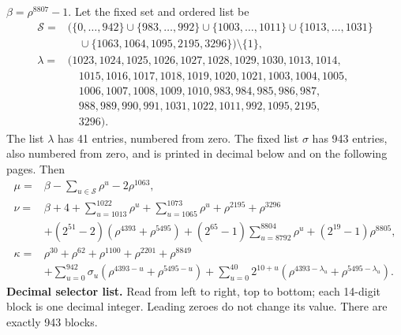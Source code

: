 \documentclass[10pt]{article}
\begin{document}
\(\beta=\rho^{8807}-1\). Let the fixed set and ordered list be
\[
\begin{aligned}
\mathcal S={}&\bigl(\{0,\ldots,942\}\cup\{983,\ldots,992\}\cup
\{1003,\ldots,1011\}\cup\{1013,\ldots,1031\}\\
&\quad\cup\{1063,1064,1095,2195,3296\}\bigr)\setminus\{1\},\\
\lambda={}&(1023,1024,1025,1026,1027,1028,1029,1030,1013,1014,\\
&\quad 1015,1016,1017,1018,1019,1020,1021,1003,1004,1005,\\
&\quad 1006,1007,1008,1009,1010,983,984,985,986,987,\\
&\quad 988,989,990,991,1031,1022,1011,992,1095,2195,\\
&\quad 3296).
\end{aligned}
\]
The list \(\lambda\) has 41 entries, numbered from zero. The fixed list
\(\sigma\) has 943 entries, also numbered from zero, and is printed in
decimal below and on the following pages. Then
\[
\begin{aligned}
\mu={}&\beta-\sum_{u\in\mathcal S}\rho^u-2\rho^{1063},\\
\nu={}&\beta+4+\sum_{u=1013}^{1022}\rho^u+\sum_{u=1065}^{1073}\rho^u
 +\rho^{2195}+\rho^{3296}\\
&+(2^{51}-2)(\rho^{4393}+\rho^{5495})
 +(2^{65}-1)\sum_{u=8792}^{8804}\rho^u+(2^{19}-1)\rho^{8805},\\
\kappa={}&\rho^{30}+\rho^{62}+\rho^{1100}+\rho^{2201}+\rho^{8849}\\
&+\sum_{u=0}^{942}\sigma_u(\rho^{4393-u}+\rho^{5495-u})
 +\sum_{u=0}^{40}2^{10+u}(\rho^{4393-\lambda_u}+\rho^{5495-\lambda_u}).
\end{aligned}
\]
\textbf{Decimal selector list.} Read from left to right, top to bottom;
each 14-digit block is one decimal integer. Leading zeroes do not change its
value. There are exactly 943 blocks.
\end{document}
